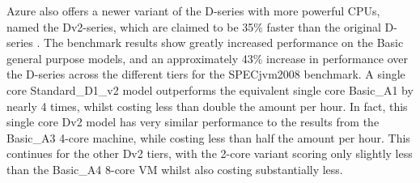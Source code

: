 \documentclass{llncs}
\begin{document}
\begin{table*}[!h]
\begin{adjustbox}{width=\linewidth,center}
  \end{adjustbox}
\end{table*}

Azure also offers a newer variant of the D-series with more powerful CPUs, named the Dv2-series, which are claimed to be 35\% faster than the original D-series \cite{azurevmtype}. The benchmark results show greatly increased performance on the Basic general purpose models, and an approximately 43\% increase in performance over the D-series across the different tiers for the SPECjvm2008 benchmark. A single core Standard\_D1\_v2 model outperforms the equivalent single core Basic\_A1 by nearly 4 times, whilst costing less than double the amount per hour. In fact, this single core Dv2 model has very similar performance to the results from the Basic\_A3 4-core machine, while costing less than half the amount per hour. This continues for the other Dv2 tiers, with the 2-core variant scoring only slightly less than the Basic\_A4 8-core VM whilst also costing substantially less.
\end{document}
